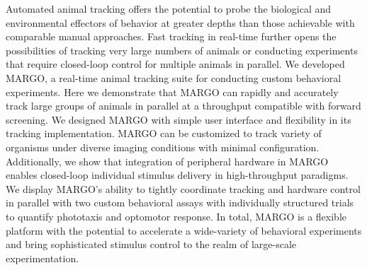 \documentclass[10pt]{article}
\begin{document}
Automated animal tracking offers the potential to probe the biological and environmental effectors of behavior at greater depths than those achievable with comparable manual approaches. Fast tracking in real-time further opens the possibilities of tracking very large numbers of animals or conducting experiments that require closed-loop control for multiple animals in parallel. We developed MARGO, a real-time animal tracking suite for conducting custom behavioral experiments. Here we demonstrate that MARGO can rapidly and accurately track large groups of animals in parallel at a throughput compatible with forward screening. We designed MARGO with simple user interface and flexibility in its tracking implementation. MARGO can be customized to track variety of organisms under diverse imaging conditions with minimal configuration. Additionally, we show that integration of peripheral hardware in MARGO enables closed-loop individual stimulus delivery in high-throughput paradigms. We display MARGO's ability to tightly coordinate tracking and hardware control in parallel with two custom behavioral assays with individually structured trials to quantify phototaxis and optomotor response. In total, MARGO is a flexible platform with the potential to accelerate a wide-variety of behavioral experiments and bring sophisticated stimulus control to the realm of large-scale experimentation.
\end{document}
